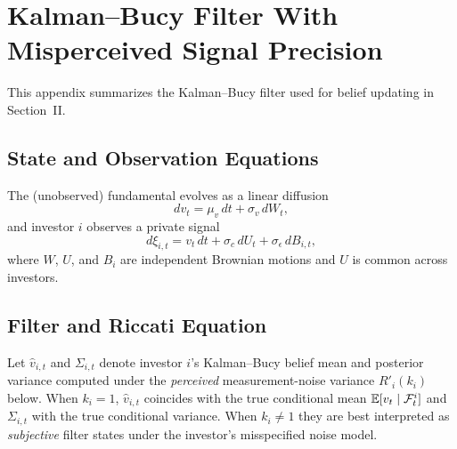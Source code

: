 
\section{Kalman--Bucy Filter With Misperceived Signal Precision}

This appendix summarizes the Kalman--Bucy filter used for belief updating in Section~II.

\subsection{State and Observation Equations}

The (unobserved) fundamental evolves as a linear diffusion
\begin{equation}
dv_t = \mu_v\,dt + \sigma_v\,dW_t,
\end{equation}
and investor $i$ observes a private signal
\begin{equation}
d\xi_{i,t} = v_t\,dt + \sigma_c\,dU_t + \sigma_\epsilon\,dB_{i,t},
\end{equation}
where $W$, $U$, and $B_i$ are independent Brownian motions and $U$ is common across investors.

\subsection{Filter and Riccati Equation}

Let $\hat v_{i,t}$ and $\Sigma_{i,t}$ denote investor $i$'s Kalman--Bucy belief mean and posterior variance computed under the \emph{perceived} measurement-noise variance $R'_i(k_i)$ below.
When $k_i=1$, $\hat v_{i,t}$ coincides with the true conditional mean $\mathbb{E}[v_t\mid \mathcal F^i_t]$ and $\Sigma_{i,t}$ with the true conditional variance.
When $k_i\ne 1$ they are best interpreted as \emph{subjective} filter states under the investor's misspecified noise model.

